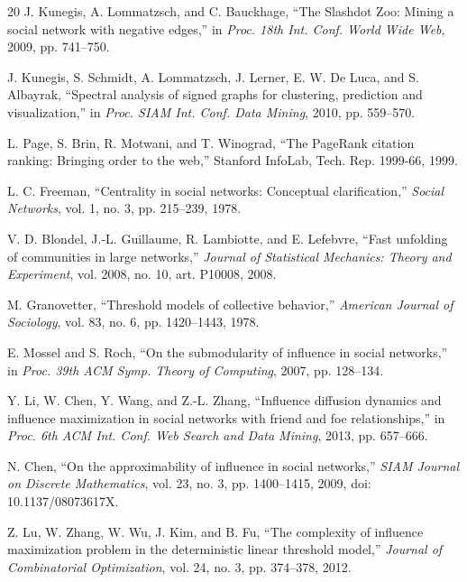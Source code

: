 \documentclass[journal,letterpaper,10pt]{IEEEtran}
\begin{document}
\begin{thebibliography}{20}
J. Kunegis, A. Lommatzsch, and C. Bauckhage, ``The Slashdot Zoo: Mining a social network with negative edges,'' in \emph{Proc. 18th Int. Conf. World Wide Web}, 2009, pp. 741--750.

J. Kunegis, S. Schmidt, A. Lommatzsch, J. Lerner, E. W. De Luca, and S. Albayrak, ``Spectral analysis of signed graphs for clustering, prediction and visualization,'' in \emph{Proc. SIAM Int. Conf. Data Mining}, 2010, pp. 559--570.

L. Page, S. Brin, R. Motwani, and T. Winograd, ``The PageRank citation ranking: Bringing order to the web,'' Stanford InfoLab, Tech. Rep. 1999-66, 1999.

L. C. Freeman, ``Centrality in social networks: Conceptual clarification,'' \emph{Social Networks}, vol. 1, no. 3, pp. 215--239, 1978.

V. D. Blondel, J.-L. Guillaume, R. Lambiotte, and E. Lefebvre, ``Fast unfolding of communities in large networks,'' \emph{Journal of Statistical Mechanics: Theory and Experiment}, vol. 2008, no. 10, art. P10008, 2008.

M. Granovetter, ``Threshold models of collective behavior,'' \emph{American Journal of Sociology}, vol. 83, no. 6, pp. 1420--1443, 1978.

E. Mossel and S. Roch, ``On the submodularity of influence in social networks,'' in \emph{Proc. 39th ACM Symp. Theory of Computing}, 2007, pp. 128--134.

Y. Li, W. Chen, Y. Wang, and Z.-L. Zhang, ``Influence diffusion dynamics and influence maximization in social networks with friend and foe relationships,'' in \emph{Proc. 6th ACM Int. Conf. Web Search and Data Mining}, 2013, pp. 657--666.

N. Chen, ``On the approximability of influence in social networks,'' \emph{SIAM Journal on Discrete Mathematics}, vol. 23, no. 3, pp. 1400--1415, 2009, doi: 10.1137/08073617X.

Z. Lu, W. Zhang, W. Wu, J. Kim, and B. Fu, ``The complexity of influence maximization problem in the deterministic linear threshold model,'' \emph{Journal of Combinatorial Optimization}, vol. 24, no. 3, pp. 374--378, 2012.

\end{thebibliography}

\balance
\end{document}
